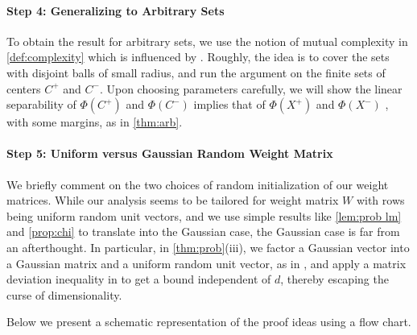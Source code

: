 \documentclass[aoap]{imsart}
\numberwithin{equation}{section}
\theoremstyle{definition}
\theoremstyle{remark}
\numberwithin{equation}{section}
\newcommand{\0}{\mathbf{0}}
\newcommand{\1}{\mathbf{1}}
\numberwithin{equation}{section}
\begin{document}
\paragraph{Step 4: Generalizing to Arbitrary Sets}
To obtain the result for arbitrary sets, we use the notion of mutual complexity in \cref{def:complexity} which is influenced by \cite{dirksen2021separation}. Roughly, the idea is to cover the sets with disjoint balls of small radius, and run the argument on the finite sets of centers $C^+$ and $C^-$. Upon choosing parameters carefully, we will show the linear separability of $\Phi(C^+)$ and $\Phi(C^-)$ implies that of $\Phi(X^+)$ and $\Phi(X^-)$ , with some margins, as in \cref{thm:arb}.

\paragraph{Step 5: Uniform versus Gaussian Random Weight Matrix} We briefly comment on the two choices of random initialization of our weight matrices. While our analysis seems to be tailored for weight matrix $W$ with rows being uniform random unit vectors, and we use simple results like \cref{lem:prob lm} and \cref{prop:chi} to translate into the Gaussian case, the Gaussian case is far from an afterthought. In particular, in \cref{thm:prob}(iii), we factor a Gaussian vector into a Gaussian matrix and a uniform random unit vector, as in \cite[Proof of Theorem 1.6]{dirksen2021separation}, and apply a matrix deviation inequality in \cite[Exercise 9.1.8]{Ver18} to get a bound independent of $d$, thereby escaping the curse of dimensionality.


Below we present a schematic representation of the proof ideas using a flow chart.
\end{document}

